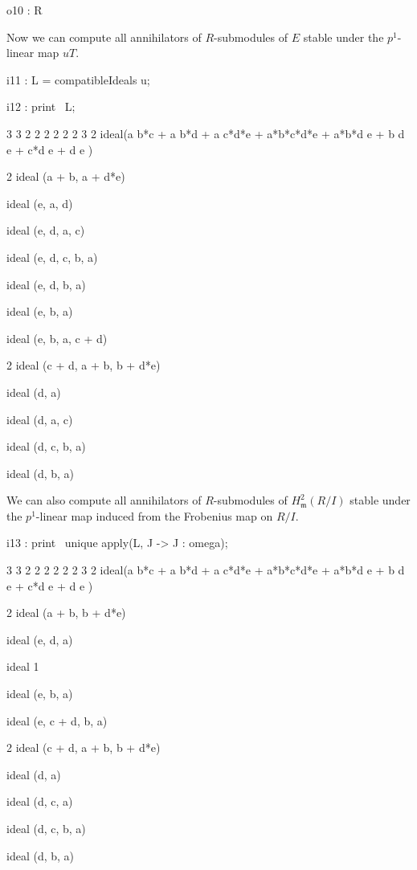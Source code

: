 \documentclass{amsart}
\begin{document}
\begin{example}
{\begin{MyVerbatim}
o10 : R
\end{MyVerbatim}
}
\medskip

Now we can compute all annihilators of $R$-submodules of $E$ stable under the $p^1$-linear map $uT$.

\medskip
{\small
{}
\begin{MyVerbatim}
i11 : L = compatibleIdeals u;

i12 : print \ L;

       3       3       2                         2     2 2       2 2    3 2
ideal(a b*c + a b*d + a c*d*e + a*b*c*d*e + a*b*d e + b d e + c*d e  + d e )

               2
ideal (a + b, a  + d*e)

ideal (e, a, d)

ideal (e, d, a, c)

ideal (e, d, c, b, a)

ideal (e, d, b, a)

ideal (e, b, a)

ideal (e, b, a, c + d)

                      2
ideal (c + d, a + b, b  + d*e)

ideal (d, a)

ideal (d, a, c)

ideal (d, c, b, a)

ideal (d, b, a)
\end{MyVerbatim}
}
\medskip

We can also compute  all annihilators of $R$-submodules of $H^2_{\mathfrak{m}} (R/I)$ stable under the $p^1$-linear map induced from the Frobenius map on $R/I$.

\medskip
{\small
{}
\begin{MyVerbatim}
i13 : print \ unique apply(L, J -> J : omega);

       3       3       2                         2     2 2       2 2    3 2
ideal(a b*c + a b*d + a c*d*e + a*b*c*d*e + a*b*d e + b d e + c*d e  + d e )

               2
ideal (a + b, b  + d*e)

ideal (e, d, a)

ideal 1

ideal (e, b, a)

ideal (e, c + d, b, a)

                      2
ideal (c + d, a + b, b  + d*e)

ideal (d, a)

ideal (d, c, a)

ideal (d, c, b, a)

ideal (d, b, a)
\end{MyVerbatim}
}
\medskip

\end{example}
\end{document}

